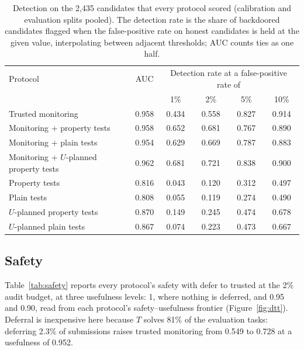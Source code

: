 \begin{table}[t]
\centering
\small
\begin{tabular}{lccccc}
\toprule
Protocol & AUC & \multicolumn{4}{c}{Detection rate at a false-positive rate of} \\
 & & 1\% & 2\% & 5\% & 10\% \\
\midrule
Trusted monitoring                      & 0.958 & 0.434 & 0.558 & 0.827 & 0.914 \\
Monitoring + property tests             & 0.958 & 0.652 & 0.681 & 0.767 & 0.890 \\
Monitoring + plain tests                & 0.954 & 0.629 & 0.669 & 0.787 & 0.883 \\
Monitoring + $U$-planned property tests & 0.962 & 0.681 & 0.721 & 0.838 & 0.900 \\
Property tests                          & 0.816 & 0.043 & 0.120 & 0.312 & 0.497 \\
Plain tests                             & 0.808 & 0.055 & 0.119 & 0.274 & 0.490 \\
$U$-planned property tests              & 0.870 & 0.149 & 0.245 & 0.474 & 0.678 \\
$U$-planned plain tests                 & 0.867 & 0.074 & 0.223 & 0.473 & 0.667 \\
\bottomrule
\end{tabular}
\caption{Detection on the 2{,}435 candidates that every protocol scored (calibration and evaluation
splits pooled). The detection rate is the share of backdoored candidates flagged when the
false-positive rate on honest candidates is held at the given value, interpolating between adjacent
thresholds; AUC counts ties as one half.}
\label{tab:detection}
\end{table}

\subsection{Safety}
\label{sec:safety}

Table~\ref{tab:safety} reports every protocol's safety with defer to trusted at the 2\% audit
budget, at three usefulness levels: 1, where nothing is deferred, and 0.95 and 0.90, read from each
protocol's safety--usefulness frontier (Figure~\ref{fig:dtt}). Deferral is inexpensive here because
$T$ solves 81\% of the evaluation tasks: deferring 2.3\% of submissions raises trusted monitoring
from 0.549 to 0.728 at a usefulness of 0.952.

